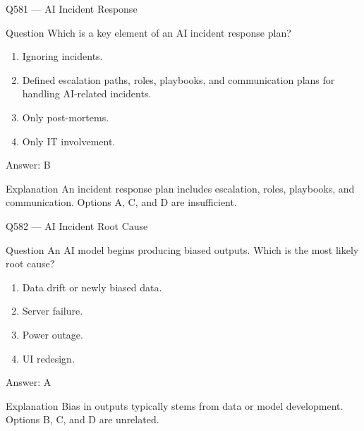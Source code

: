\documentclass[aspectratio=169,8pt]{beamer}
\begin{document}
	\begin{frame}{Q581 --- AI Incident Response}
		\begin{block}{Question}
			Which is a key element of an AI incident response plan?
			\begin{enumerate}
				\item Ignoring incidents.
				\item Defined escalation paths, roles, playbooks, and communication plans for handling AI-related incidents.
				\item Only post-mortems.
				\item Only IT involvement.
			\end{enumerate}
		\end{block}
		\begin{exampleblock}{Answer: B}\end{exampleblock}
		\begin{block}{Explanation}
			An incident response plan includes escalation, roles, playbooks, and communication. Options A, C, and D are insufficient.
		\end{block}
	\end{frame}
	
	\begin{frame}{Q582 --- AI Incident Root Cause}
		\begin{block}{Question}
			An AI model begins producing biased outputs. Which is the most likely root cause?
			\begin{enumerate}
				\item Data drift or newly biased data.
				\item Server failure.
				\item Power outage.
				\item UI redesign.
			\end{enumerate}
		\end{block}
		\begin{exampleblock}{Answer: A}\end{exampleblock}
		\begin{block}{Explanation}
			Bias in outputs typically stems from data or model development. Options B, C, and D are unrelated.
		\end{block}
	\end{frame}
	
\end{document}
